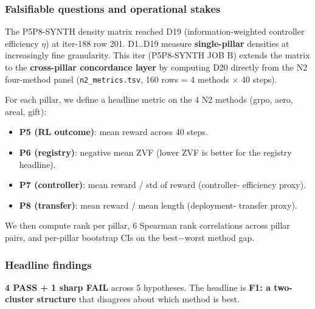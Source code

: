 
\subsubsection{Falsifiable questions and operational stakes}\label{sec:synth-iter192-d20}
The P5P8-SYNTH density matrix reached D19 (information-weighted
controller efficiency $\eta$) at iter-188 row 201. D1..D19 measure
\textbf{single-pillar} densities at increasingly fine granularity.
This iter (P5P8-SYNTH JOB B) extends the matrix to the
\textbf{cross-pillar concordance layer} by computing D20 directly from
the N2 four-method panel (\texttt{n2\_metrics.tsv}, 160 rows = 4 methods
$\times$ 40 steps).

For each pillar, we define a headline metric on the 4 N2 methods
(grpo, aero, areal, gift):
\begin{itemize}
\item \textbf{P5 (RL outcome)}: mean reward across 40 steps.
\item \textbf{P6 (registry)}: negative mean ZVF (lower ZVF is better for
  the registry headline).
\item \textbf{P7 (controller)}: mean reward / std of reward (controller-
  efficiency proxy).
\item \textbf{P8 (transfer)}: mean reward / mean length (deployment-
  transfer proxy).
\end{itemize}

We then compute rank per pillar, 6 Spearman rank correlations across
pillar pairs, and per-pillar bootstrap CIs on the best$-$worst method gap.

\subsubsection{Headline findings}\label{sec:synth-iter192-d20-results}
\textbf{4 PASS + 1 sharp FAIL} across 5 hypotheses. The headline is
\textbf{F1: a two-cluster structure} that disagrees about which method
is best.

